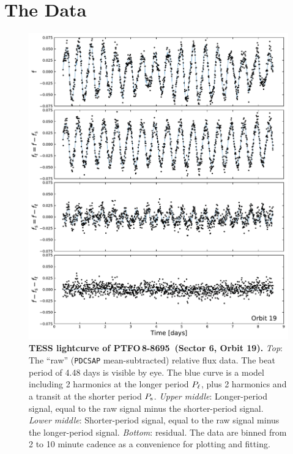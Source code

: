 \documentclass[12pt,twocolumn,tighten]{aastex62}
\newcommand{\ptfo}{PTFO$\,$8-8695}
\begin{document}
\section{The Data}
\label{sec:observations}


\begin{figure}[t!]
	\begin{center}
		\leavevmode
		\includegraphics[width=1\textwidth]{f1.pdf}
	\end{center}
	\vspace{-0.7cm}
	\caption{
		{\bf TESS lightcurve of \ptfo\ (Sector 6, Orbit 19).}
    {\it Top}: The ``raw'' (\texttt{PDCSAP} mean-subtracted) relative flux
    data. The beat period of 4.48 days is visible by eye.  The
    blue curve is a model including 2 harmonics
    at the longer period $P_{\rm \ell}$, plus 2 harmonics and a transit
    at the shorter period $P_{\rm s}$.
		{\it Upper middle}: Longer-period signal, equal to the raw signal
		minus the shorter-period signal.
		{\it Lower middle}: Shorter-period signal, equal to the raw signal
		minus the longer-period signal.
		{\it Bottom}: residual.  The data are binned from 2 to 10 minute
		cadence as a convenience for plotting and fitting.
		\label{fig:splitsignal}
	}
\end{figure}
\end{document}
